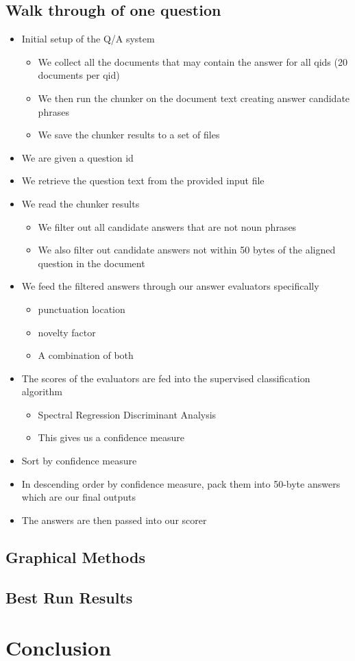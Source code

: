 \documentclass{article}
\begin{document}
\subsection{Walk through of one question}
\begin{itemize}
\item Initial setup of the Q/A system
    \begin{itemize}
    \item We collect all the documents that may contain the answer for all qids (20 documents per qid)
    \item We then run the chunker on the document text creating answer candidate phrases
    \item We save the chunker results to a set of files
    \end{itemize}
\item We are given a question id
\item We retrieve the question text from the provided input file
\item We read the chunker results 
    \begin{itemize}
    \item We filter out all candidate answers that are not noun phrases
    \item We also filter out candidate answers not within 50 bytes of the aligned question in the document
    \end{itemize}
\item We feed the filtered answers through our answer evaluators specifically
    \begin{itemize}
    \item punctuation location
    \item novelty factor
    \item A combination of both
    \end{itemize}
\item The scores of the evaluators are fed into the supervised classification algorithm
    \begin{itemize}
    \item Spectral Regression Discriminant Analysis 
    \item This gives us a confidence measure
    \end{itemize}
\item Sort by confidence measure 
\item In descending order by confidence measure, pack them into 50-byte answers which are our final outputs
\item The answers are then passed into our scorer
\end{itemize}

\subsection{Graphical Methods}

\subsection{Best Run Results}

\section{Conclusion}
\end{document}
